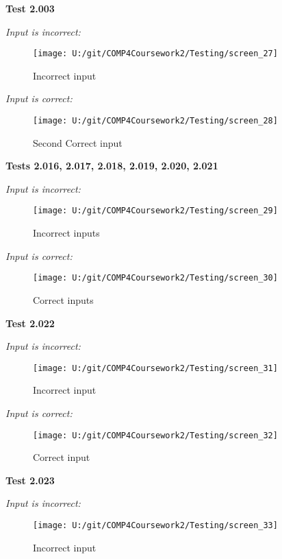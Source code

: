 \textbf{Test 2.003}

\textit{Input is incorrect: }

\begin{figure}[H]
    \label{fig: Second Screen}\caption{Incorrect input}
    \texttt{[image: U:/git/COMP4Coursework2/Testing/screen\_27]}
\end{figure}

\textit{Input is correct: }

\begin{figure}[H]
    \label{fig: Second Screen}\caption{Second Correct input}
    \texttt{[image: U:/git/COMP4Coursework2/Testing/screen\_28]}
\end{figure}

\textbf{Tests 2.016, 2.017, 2.018, 2.019, 2.020, 2.021}

\textit{Input is incorrect: }

\begin{figure}[H]
    \label{fig: Second Screen}\caption{Incorrect inputs}
    \texttt{[image: U:/git/COMP4Coursework2/Testing/screen\_29]}
\end{figure}

\textit{Input is correct: }

\begin{figure}[H]
    \label{fig: Second Screen}\caption{Correct inputs}
    \texttt{[image: U:/git/COMP4Coursework2/Testing/screen\_30]}
\end{figure}

\textbf{Test 2.022}

\textit{Input is incorrect: }

\begin{figure}[H]
    \label{fig: Second Screen}\caption{Incorrect input}
    \texttt{[image: U:/git/COMP4Coursework2/Testing/screen\_31]}
\end{figure}

\textit{Input is correct: }

\begin{figure}[H]
    \label{fig: Second Screen}\caption{Correct input}
    \texttt{[image: U:/git/COMP4Coursework2/Testing/screen\_32]}
\end{figure}

\textbf{Test 2.023}

\textit{Input is incorrect: }

\begin{figure}[H]
    \label{fig: Second Screen}\caption{Incorrect input}
    \texttt{[image: U:/git/COMP4Coursework2/Testing/screen\_33]}
\end{figure}

